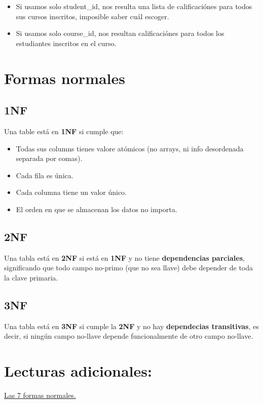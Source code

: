 \documentclass{article}
\begin{document}
\begin{multicols}{2}
		\begin{itemize}
			\item Si usamos solo student\_id, nos resulta una lista de calificaciónes para todos sus cursos inscritos, imposible saber cuál escoger.
			\item Si usamos solo course\_id, nos resultan calificaciónes para todos los estudiantes inscritos en el curso.
		\end{itemize}
		
		\section{Formas normales}
		
		\subsection{1NF}
		
		Una table está en \textbf{1NF} si cumple que:
		
		\begin{itemize}
			\item Todas sus columns tienes valore atómicos (no arrays, ni info desordenada separada por comas).
			\item Cada fila es única.
			\item Cada columna tiene un valor único.
			\item El orden en que se almacenan los datos no importa.
		\end{itemize}
		
		\subsection{2NF}
		
		Una tabla está en \textbf{2NF} si está en \textbf{1NF} y no tiene \textbf{dependencias parciales}, significando que todo campo no-primo (que no sea llave) debe depender de toda la clave primaria.
		
		\subsection{3NF}
		
		Una tabla está en \textbf{3NF} si cumple la \textbf{2NF} y no hay \textbf{dependecias transitivas}, es decir, si ningún campo no-llave depende funcionalmente de otro campo no-llave.
		
		\section{Lecturas adicionales:}
		
		\href{https://www.geeksforgeeks.org/dbms/normal-forms-in-dbms/}{Las 7 formas normales.}
	\end{multicols}
	
\end{document}
